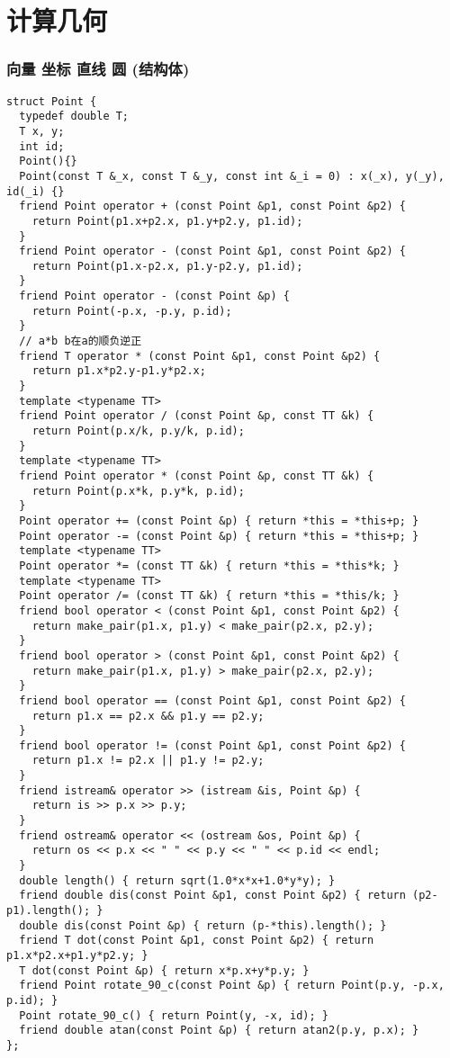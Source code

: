\documentclass[12pt]{article}
\begin{document}
{{{{{{{{{\part{计算几何}
\section{向量 坐标 直线 圆 (结构体)}
{\setmainfont{Consolas}
\begin{lstlisting}
struct Point {
  typedef double T;
  T x, y;
  int id;
  Point(){}
  Point(const T &_x, const T &_y, const int &_i = 0) : x(_x), y(_y), id(_i) {}
  friend Point operator + (const Point &p1, const Point &p2) {
    return Point(p1.x+p2.x, p1.y+p2.y, p1.id);
  }
  friend Point operator - (const Point &p1, const Point &p2) {
    return Point(p1.x-p2.x, p1.y-p2.y, p1.id);
  }
  friend Point operator - (const Point &p) {
    return Point(-p.x, -p.y, p.id);
  }
  // a*b b在a的顺负逆正
  friend T operator * (const Point &p1, const Point &p2) {
    return p1.x*p2.y-p1.y*p2.x;
  }
  template <typename TT>
  friend Point operator / (const Point &p, const TT &k) {
    return Point(p.x/k, p.y/k, p.id);
  }
  template <typename TT>
  friend Point operator * (const Point &p, const TT &k) {
    return Point(p.x*k, p.y*k, p.id);
  }
  Point operator += (const Point &p) { return *this = *this+p; }
  Point operator -= (const Point &p) { return *this = *this+p; }
  template <typename TT>
  Point operator *= (const TT &k) { return *this = *this*k; }
  template <typename TT>
  Point operator /= (const TT &k) { return *this = *this/k; }
  friend bool operator < (const Point &p1, const Point &p2) {
    return make_pair(p1.x, p1.y) < make_pair(p2.x, p2.y);
  }
  friend bool operator > (const Point &p1, const Point &p2) {
    return make_pair(p1.x, p1.y) > make_pair(p2.x, p2.y);
  }
  friend bool operator == (const Point &p1, const Point &p2) {
    return p1.x == p2.x && p1.y == p2.y;
  }
  friend bool operator != (const Point &p1, const Point &p2) {
    return p1.x != p2.x || p1.y != p2.y;
  }
  friend istream& operator >> (istream &is, Point &p) {
    return is >> p.x >> p.y;
  }
  friend ostream& operator << (ostream &os, Point &p) {
    return os << p.x << " " << p.y << " " << p.id << endl;
  }
  double length() { return sqrt(1.0*x*x+1.0*y*y); }
  friend double dis(const Point &p1, const Point &p2) { return (p2-p1).length(); }
  double dis(const Point &p) { return (p-*this).length(); }
  friend T dot(const Point &p1, const Point &p2) { return p1.x*p2.x+p1.y*p2.y; }
  T dot(const Point &p) { return x*p.x+y*p.y; }
  friend Point rotate_90_c(const Point &p) { return Point(p.y, -p.x, p.id); }
  Point rotate_90_c() { return Point(y, -x, id); }
  friend double atan(const Point &p) { return atan2(p.y, p.x); }
};


\end{lstlisting}}}}}}}}}}}
\end{document}
